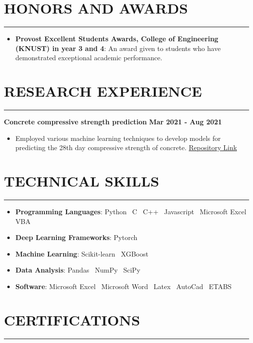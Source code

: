 \documentclass[letterpaper, 11pt]{article}
\newcommand{\cvsection}[1]{
	\section*{#1} \vspace*{-0.8cm}%
	\rule{\linewidth}{1.5pt}\par
}
\begin{document}

\cvsection{HONORS AND AWARDS}

\begin{itemize}[leftmargin=*]

	\item \textbf{Provost Excellent Students Awards, College of Engineering (KNUST) in year 3 and 4}:
	      An award given to students who have demonstrated exceptional academic performance.

\end{itemize}


\cvsection{RESEARCH EXPERIENCE}

\textbf{Concrete compressive strength prediction} \hfill \space \textbf{Mar 2021 - Aug 2021}

\begin{itemize}[leftmargin=*]

	\item Employed various machine learning techniques to develop models for predicting the 28th day
	      compressive strength of concrete.
	      \href{https://www.github.com/patrickboateng/compressive-strength-prediction}{Repository Link}

\end{itemize}


\cvsection{TECHNICAL SKILLS}

\begin{itemize}[leftmargin=*]

	\item \textbf{Programming Languages}: Python \vrule \, C \vrule \, C++ \vrule \,  Javascript \vrule \, Microsoft Excel VBA
	\item \textbf{Deep Learning Frameworks}: Pytorch
	\item \textbf{Machine Learning}: Scikit-learn \vrule \, XGBoost
	\item \textbf{Data Analysis}: Pandas \vrule \, NumPy \vrule \, SciPy
	\item \textbf{Software}: Microsoft Excel \vrule \, Microsoft Word \vrule \, Latex \vrule \, AutoCad \vrule \, ETABS

\end{itemize}


\cvsection{CERTIFICATIONS}
\end{document}
